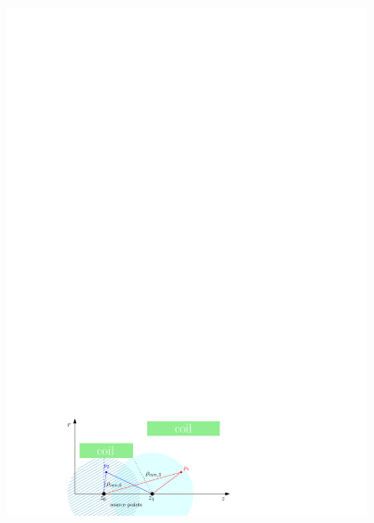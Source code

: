 	\begin{figure}[htbp]
	      \centering
	      \begin{minipage}{0.49\textwidth}
		\includegraphics[width=0.95\textwidth]{images/KAFCAFigures/two_coils_central_two_sp.pdf}
	      \end{minipage}
	      \begin{minipage}{0.49\textwidth}

\end{minipage}
\end{figure}
